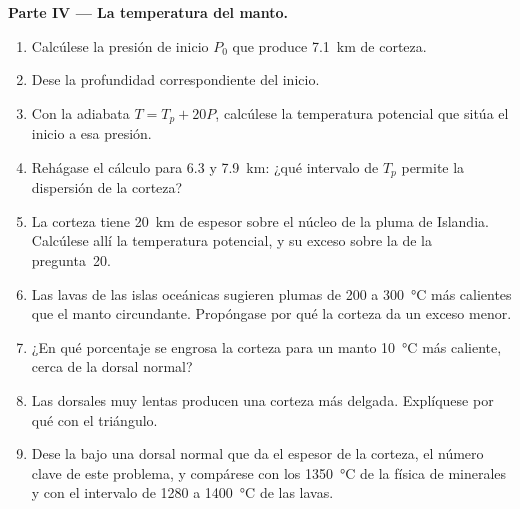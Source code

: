 \begin{problem}
\noindent\textbf{Parte IV --- La temperatura del manto.}
\begin{enumerate}[resume]
\item Calcúlese la presión de inicio $P_0$ que produce \qty{7.1}{km} de corteza.
\item Dese la profundidad correspondiente del inicio.
\item Con la adiabata $T = T_p + 20P$, calcúlese la temperatura potencial que
sitúa el inicio a esa presión.
\item Rehágase el cálculo para 6.3 y \qty{7.9}{km}: ¿qué intervalo de $T_p$ permite la
dispersión de la corteza?
\item La corteza tiene \qty{20}{km} de espesor sobre el núcleo de la pluma de Islandia. Calcúlese
allí la temperatura potencial, y su exceso sobre la de la pregunta~20.
\item Las lavas de las islas oceánicas sugieren plumas de 200 a \qty{300}{\celsius} más calientes que
el manto circundante. Propóngase por qué la corteza da un exceso menor.
\item ¿En qué porcentaje se engrosa la corteza para un manto \qty{10}{\celsius}
más caliente, cerca de la dorsal normal?
\item Las dorsales muy lentas producen una corteza más delgada. Explíquese por qué con el triángulo.
\item Dese la  bajo una dorsal normal que da el
espesor de la corteza, el número clave de este problema, y compárese
con los \qty{1350}{\celsius} de la física de minerales y con el intervalo de 1280 a
\qty{1400}{\celsius} de las lavas.
\end{enumerate}
\end{problem}
